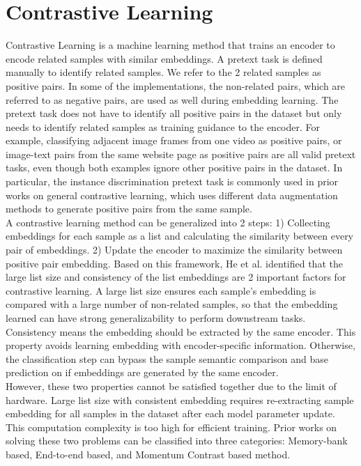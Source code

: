 \documentclass[12pt,twoside]{report}
\begin{document}
\section{Contrastive Learning}
Contrastive Learning is a machine learning method that trains an encoder to encode related samples with similar embeddings. A pretext task is defined manually to identify related samples. We refer to the 2 related samples as positive pairs. In some of the implementations, the non-related pairs, which are referred to as negative pairs, are used as well during embedding learning. The pretext task does not have to identify all positive pairs in the dataset but only needs to identify related samples as training guidance to the encoder. For example, classifying adjacent image frames from one video as positive pairs, or image-text pairs from the same website page as positive pairs are all valid pretext tasks, even though both examples ignore other positive pairs in the dataset. In particular, the instance discrimination pretext task is commonly used in prior works on general contrastive learning, which uses different data augmentation methods to generate positive pairs from the same sample. \\

A contrastive learning method can be generalized into 2 steps: 1) Collecting embeddings for each sample as a list and calculating the similarity between every pair of embeddings. 2) Update the encoder to maximize the similarity between positive pair embedding. Based on this framework, He et al.\cite{moco} identified that the large list size and consistency of the list embeddings are 2 important factors for contrastive learning. A large list size ensures each sample's embedding is compared with a large number of non-related samples, so that the embedding learned can have strong generalizability to perform downstream tasks. Consistency means the embedding should be extracted by the same encoder. This property avoids learning embedding with encoder-specific information. Otherwise, the classification step can bypass the sample semantic comparison and base prediction on if embeddings are generated by the same encoder. \\

However, these two properties cannot be satisfied together due to the limit of hardware. Large list size with consistent embedding requires re-extracting sample embedding for all samples in the dataset after each model parameter update. This computation complexity is too high for efficient training. Prior works on solving these two problems can be classified into three categories: Memory-bank based, End-to-end based, and Momentum Contrast based method. 
\end{document}
